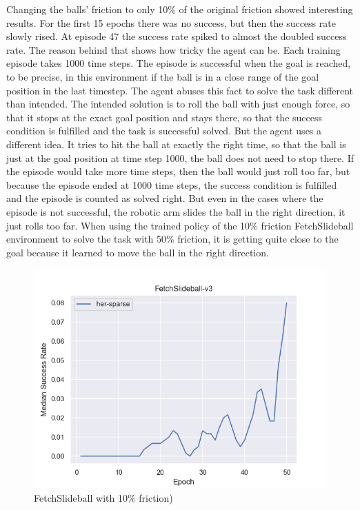 Changing the balls' friction to only 10\% of the original friction showed interesting results. For the first 15 epochs there was no success, but then the success rate slowly rised. At episode 47 the success rate spiked to almost the doubled success rate. The reason behind that shows how tricky the agent can be. Each training episode takes 1000 time steps. The episode is successful when the goal is reached, to be precise, in this environment if the ball is in a close range of the goal position in the last timestep.
The agent abuses this fact to solve the task different than intended. The intended solution is to roll the ball with just enough force, so that it stops at the exact goal position and stays there, so that the success condition is fulfilled and the task is successful solved. But the agent uses a different idea. It tries to hit the ball at exactly the right time, so that the ball is just at the goal position at time step 1000, the ball does not need to stop there. If the episode would take more time steps, then the ball would just roll too far, but because the episode ended at 1000 time steps, the success condition is fulfilled and the episode is counted as solved right.
But even in the cases where the episode is not successful, the robotic arm slides the ball in the right direction, it just rolls too far. When using the trained policy of the 10\% friction FetchSlideball environment to solve the task with 50\% friction, it is getting quite close to the goal because it learned to move the ball in the right direction.


\begin{figure} [h]
	
	\centering
	\includegraphics[width=1\textwidth]{figures/fig_FetchSlideball-v3.png}
	\caption{FetchSlideball with 10\% friction)}
	
\end{figure}

